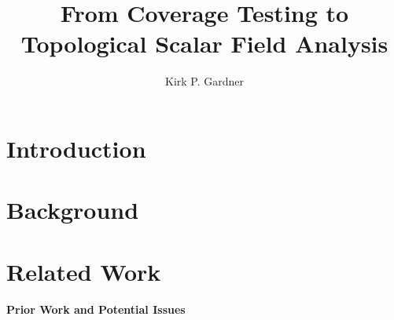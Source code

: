 \documentclass[12pt]{article}
\title{From Coverage Testing to Topological Scalar Field Analysis}
\author{Kirk P. Gardner}
\begin{document}
\maketitle



\section{Introduction}


\section{Background}


\section{Related Work}
% 





% 


% 
%
%
\paragraph{Prior Work and Potential Issues}





\end{document}
